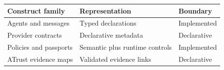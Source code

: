 \begin{tabularx}{\linewidth}{@{}XXX@{}}
\toprule
Construct family & Representation & Boundary \\
\midrule
Agents and messages & Typed declarations & Implemented \\
Provider contracts & Declarative metadata & Declarative \\
Policies and passports & Semantic plus runtime controls & Implemented \\
ATrust evidence maps & Validated evidence links & Declarative \\
\bottomrule
\end{tabularx}
